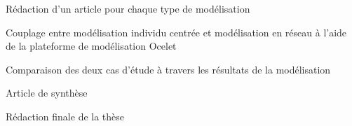 \item	Rédaction d'un article pour chaque type de modélisation


\subject{3ème année}


\item	Couplage entre modélisation individu centrée
	et modélisation en réseau à l'aide de
	la plateforme de modélisation Ocelet

\item	Comparaison des deux cas d'étude
	à travers les résultats de la modélisation

\item	Article de synthèse

\item	Rédaction finale de la thèse

\stopitemize